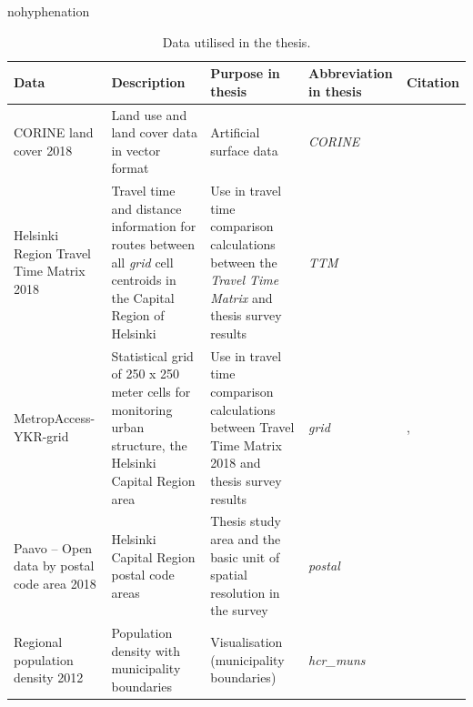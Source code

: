 \begin{hyphenrules}{nohyphenation}
    \begin{table}[H]
        \centering
        \caption[Thesis data]{Data utilised in the thesis.} 
        \label{tab:used_data}
        \scalebox{0.8}
        {\def\arraystretch{1.5} 
        \setlength\tabcolsep{1.2ex}
        \begin{tabular}{ @{} >{\raggedright\arraybackslash}p{4cm} >{\raggedright\arraybackslash}p{4cm} >{\raggedright\arraybackslash}p{4.5cm} >{\raggedright\arraybackslash}p{3.5cm} >{\raggedleft\arraybackslash}p{3.5cm} @{} }
            \toprule
            Data & Description & Purpose in thesis & Abbreviation in thesis & Citation \\
            \midrule
            CORINE land cover 2018 & Land use and land cover data in vector format & Artificial surface data & \textit{CORINE} & \cite{FinnishEnvironmentInstitute2018} \\
            Helsinki Region Travel Time Matrix 2018 & Travel time and distance information for routes between all \textit{grid} cell centroids in the Capital Region of Helsinki & Use in travel time comparison calculations between the \textit{Travel Time Matrix} and thesis survey results & \textit{TTM} & \cite{Tenkanen2018} \\
            MetropAccess-YKR-grid & Statistical grid of 250 x 250 meter cells for monitoring urban structure, the Helsinki Capital Region area & Use in travel time comparison calculations between Travel Time Matrix 2018 and thesis survey results & \textit{grid} & \cite{Toivonen2014a}, \cite{StatisticsFinland2020} \\
            Paavo -- Open data by postal code area 2018 & Helsinki Capital Region postal code areas & Thesis study area and the basic unit of spatial resolution in the survey & \textit{postal} & \cite{StatisticsFinland2019a} \\
            Regional population density 2012 & Population density with municipality boundaries & Visualisation (municipality boundaries) & \textit{hcr\_muns} & \cite{StatisticsFinland2012} \\

\end{tabular}}
\end{table}
\end{hyphenrules}
